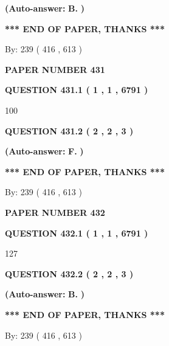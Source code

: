 \documentclass[12pt]{article}
\begin{document}
 
{\textbf{(Auto-answer:}}
{\textbf{\large{
B.}}}
{\textbf{)}}
 
 
   
   
   
   
\vspace{1.0in} 
{\textbf{\large{ *** END OF PAPER, THANKS *** }}} 
   
   
\hspace{1.0in} By: 
 239 ( 416 ,  613 )
   
   
   
   
\newpage 
\setcounter{page}{ 
   431001 } 
   
   
 {\textbf{ \Large{ PAPER NUMBER  431  }}}
   
   
   
   
  
  
{\textbf{\large{QUESTION
431.1 
 ( 1 , 1 , 6791 )
}}}

100
  
  
{\textbf{\large{QUESTION
431.2 
 ( 2 , 2 , 3 )
}}}
 
 
{\textbf{(Auto-answer:}}
{\textbf{\large{
F.}}}
{\textbf{)}}
 
 
   
   
   
   
\vspace{1.0in} 
{\textbf{\large{ *** END OF PAPER, THANKS *** }}} 
   
   
\hspace{1.0in} By: 
 239 ( 416 ,  613 )
   
   
   
   
\newpage 
\setcounter{page}{ 
   432001 } 
   
   
 {\textbf{ \Large{ PAPER NUMBER  432  }}}
   
   
   
   
  
  
{\textbf{\large{QUESTION
432.1 
 ( 1 , 1 , 6791 )
}}}

127
  
  
{\textbf{\large{QUESTION
432.2 
 ( 2 , 2 , 3 )
}}}
 
 
{\textbf{(Auto-answer:}}
{\textbf{\large{
B.}}}
{\textbf{)}}
 
 
   
   
   
   
\vspace{1.0in} 
{\textbf{\large{ *** END OF PAPER, THANKS *** }}} 
   
   
\hspace{1.0in} By: 
 239 ( 416 ,  613 )
   
   
   
\end{document}
